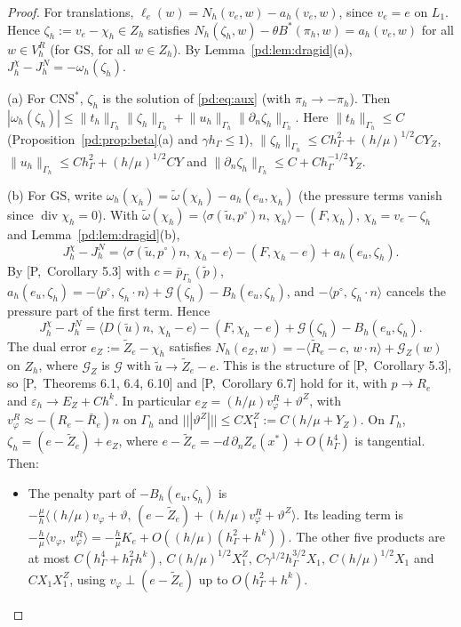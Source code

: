 \documentclass[11pt,reqno]{amsart}
\theoremstyle{plain}
\theoremstyle{definition}
\newcommand{\hG}{h_\Gamma}
\newcommand{\Gh}{\Gamma_h}
\newcommand{\VR}{V_h^R}
\newcommand{\Zh}{Z_h}
\newcommand{\dn}{\partial_n}
\newcommand{\ut}{\tilde u}
\newcommand{\pt}{\tilde p}
\newcommand{\pbar}{\bar p}
\newcommand{\ip}[2]{\langle #1,\, #2\rangle}
\newcommand{\tnorm}[1]{|\!|\!|#1|\!|\!|}
\newcommand{\norm}[1]{\lVert #1\rVert}
\newcommand{\GS}{\mathrm{GS}}
\newcommand{\CNS}{\mathrm{CNS}^\ast}
\newcommand{\eps}{\varepsilon_h}
\renewcommand{\div}{\operatorname{div}}
\newcommand{\Gc}{\mathcal G}
\newcommand{\Pref}[1]{\textup{[P,~#1]}}
\newcommand{\Lay}{L_1}
\newcommand{\Bh}{B_h}
\begin{document}
\begin{proof}
For translations, $\ell_e(w)=N_h(v_e,w)-a_h(v_e,w)$, since $v_e=e$ on $\Lay$. Hence $\zeta_h:=v_e-\chi_h\in\Zh$ satisfies $N_h(\zeta_h,w)-\theta B^\ast(\pi_h,w)=a_h(v_e,w)$ for all $w\in\VR$ (for $\GS$, for all $w\in\Zh$). By Lemma~\ref{pd:lem:dragid}(a), $J^\chi_h-J^N_h=-\omega_h(\zeta_h)$.

(a) For $\CNS$, $\zeta_h$ is the solution of \eqref{pd:eq:aux} (with $\pi_h\to-\pi_h$). Then $|\omega_h(\zeta_h)|\le\norm{t_h}_{\Gh}\norm{\zeta_h}_{\Gh}+\norm{u_h}_{\Gh}\norm{\dn\zeta_h}_{\Gh}$. Here $\norm{t_h}_{\Gh}\le C$ (Proposition~\ref{pd:prop:beta}(a) and $\gamma\hG\le1$), $\norm{\zeta_h}_{\Gh}\le C\hG^2+(h/\mu)^{1/2}CY_Z$, $\norm{u_h}_{\Gh}\le C\hG^2+(h/\mu)^{1/2}CY$ and $\norm{\dn\zeta_h}_{\Gh}\le C+C\hG^{-1/2}Y_Z$.

(b) For $\GS$, write $\omega_h(\chi_h)=\tilde\omega(\chi_h)-a_h(e_u,\chi_h)$ (the pressure terms vanish since $\div\chi_h=0$). With $\tilde\omega(\chi_h)=\ip{\sigma(\ut,p^\circ)n}{\chi_h}-(F,\chi_h)$, $\chi_h=v_e-\zeta_h$ and Lemma~\ref{pd:lem:dragid}(b),
\[
J^\chi_h-J^N_h=\ip{\sigma(\ut,p^\circ)n}{\chi_h-e}-(F,\chi_h-e)+a_h(e_u,\zeta_h).
\]
By \Pref{Corollary 5.3} with $c=\pbar_{\Gh}(\pt)$, $a_h(e_u,\zeta_h)=-\ip{p^\circ}{\zeta_h\cdot n}+\Gc(\zeta_h)-\Bh(e_u,\zeta_h)$, and $-\ip{p^\circ}{\zeta_h\cdot n}$ cancels the pressure part of the first term. Hence
\[
J^\chi_h-J^N_h=\ip{D(\ut)n}{\chi_h-e}-(F,\chi_h-e)+\Gc(\zeta_h)-\Bh(e_u,\zeta_h).
\]
The dual error $e_Z:=\tilde Z_e-\chi_h$ satisfies $N_h(e_Z,w)=-\ip{\tilde R_e-c}{w\cdot n}+\Gc_Z(w)$ on $\Zh$, where $\Gc_Z$ is $\Gc$ with $\ut\to\tilde Z_e-e$. This is the structure of \Pref{Corollary 5.3}, so \Pref{Theorems 6.1, 6.4, 6.10} and \Pref{Corollary 6.7} hold for it, with $p\to R_e$ and $\eps\to E_Z+Ch^k$. In particular $e_Z=(h/\mu)v^R_\varphi+\vartheta^Z$, with $v^R_\varphi\approx-(R_e-\bar R_e)n$ on $\Gh$ and $\tnorm{\vartheta^Z}\le CX_1^Z:=C(h/\mu+Y_Z)$. On $\Gh$, $\zeta_h=(e-\tilde Z_e)+e_Z$, where $e-\tilde Z_e=-d\,\dn Z_e(x^\ast)+O(\hG^4)$ is tangential. Then:
\begin{itemize}
\item The penalty part of $-\Bh(e_u,\zeta_h)$ is $-\frac\mu h\ip{(h/\mu)v_\varphi+\vartheta}{(e-\tilde Z_e)+(h/\mu)v^R_\varphi+\vartheta^Z}$. Its leading term is $-\frac h\mu\ip{v_\varphi}{v^R_\varphi}=-\frac h\mu K_e+O((h/\mu)(\hG^2+h^k))$. The other five products are at most $C(\hG^4+\hG^2h^k)$, $C(h/\mu)^{1/2}X_1^Z$, $C\gamma^{1/2}\hG^{3/2}X_1$, $C(h/\mu)^{1/2}X_1$ and $CX_1X_1^Z$, using $v_\varphi\perp(e-\tilde Z_e)$ up to $O(\hG^2+h^k)$.

\end{itemize}
\end{proof}
\end{document}
